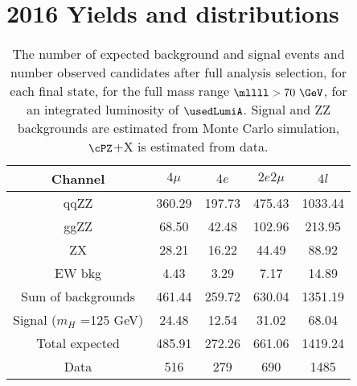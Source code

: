 \section{2016 Yields and distributions}

\begin{table}[htb]
	\begin{center}
		\small
		\caption{The number of expected background and signal events 
			and number observed candidates after full analysis selection, for each final state, 
			for the full mass range $\mllll>70~\GeV$, for an integrated luminosity of $\usedLumiA$.
			Signal and ZZ backgrounds are estimated from Monte Carlo simulation,
			$\cPZ$+X is estimated from data.
			\label{tab:EventYieldsA}}
		
\begin{tabular}{|c|c|c|c|c|}
	\hline
	\hline
	\textbf{Channel} & $4\mu$ & $4 e$ & $2e2\mu$ & $4l$ \\
	\hline
	qqZZ     &360.29         &197.73         &475.43         &1033.44        \\
	ggZZ     &68.50  &42.48  &102.96         &213.95         \\
	ZX       &28.21  &16.22  &44.49  &88.92  \\
	EW bkg   &4.43   &3.29   &7.17   &14.89  \\
	\hline
	Sum of backgrounds       &461.44         &259.72         &630.04         &1351.19        \\
	\hline
	Signal ($m_{H}$ =125 GeV)        &24.48  &12.54  &31.02  &68.04  \\
	\hline
	Total expected   &485.91        &272.26 &661.06 &1419.24         \\
	\hline
	Data     &516    &279    &690    &1485   \\
	\hline
	\hline
\end{tabular}

\end{center}
\end{table}


